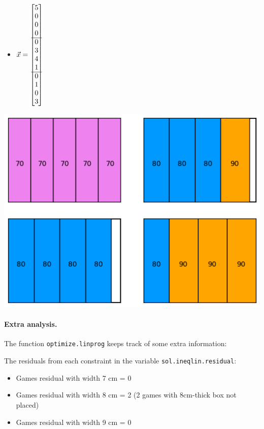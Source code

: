 \begin{enumerate}
\begin{minipage}{.2\textwidth}
	\begin{itemize}
		\item $\vec{x} = \begin{bmatrix}5 \\ 0 \\ 0 \\ 0  \\\hline 0 \\ 3 \\ 4 \\ 1 \\\hline 0 \\ 1 \\ 0 \\ 3\end{bmatrix}$
	\end{itemize}
\end{minipage}
\hfil 
\begin{minipage}{.5\textwidth}
	\includegraphics[width=\textwidth]{boardgame.png}
\end{minipage}


\paragraph{Extra analysis.} The function \texttt{optimize.linprog} keeps track of some extra information:

The residuals from each constraint in the variable \texttt{sol.ineqlin.residual}:
	\begin{itemize}
		\item Games residual with width 7 cm = 0
		\item Games residual with width 8 cm = 2 \hfill (2 games with 8cm-thick box not placed)
		\item Games residual with width 9 cm = 0 \\
		

\end{itemize}
\end{enumerate}
